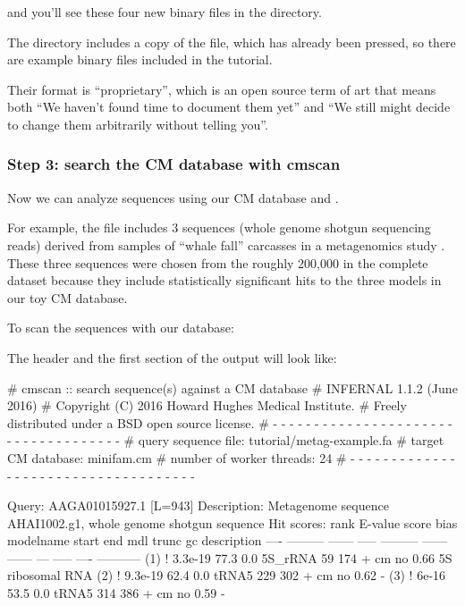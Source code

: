 and you'll see these four new binary files in the directory. 

The  directory includes a copy of the
 file, which has already been pressed, so there
are example binary files 
included in the tutorial.

Their format is ``proprietary'', which is an open source term of art
that means both ``We haven't found time to document them yet'' and ``We
still might decide to change them arbitrarily without telling you''.

\subsubsection{Step 3: search the CM database with cmscan}

Now we can analyze sequences using our CM database and
. 

For example, the file  includes 3
sequences (whole genome shotgun sequencing reads) derived from samples
of ``whale fall'' carcasses in a metagenomics study
\citep{Tringe05}. These three sequences were chosen from the roughly
200,000 in the complete dataset because they include statistically
significant hits to the three models in our toy CM database.

To scan the sequences with our database: 


The header and the first section of the output will look like:

\newpage

\begin{sreoutput}
# cmscan :: search sequence(s) against a CM database
# INFERNAL 1.1.2 (June 2016)
# Copyright (C) 2016 Howard Hughes Medical Institute.
# Freely distributed under a BSD open source license.
# - - - - - - - - - - - - - - - - - - - - - - - - - - - - - - - - - - - -
# query sequence file:                   tutorial/metag-example.fa
# target CM database:                    minifam.cm
# number of worker threads:              24
# - - - - - - - - - - - - - - - - - - - - - - - - - - - - - - - - - - - -

Query:       AAGA01015927.1  [L=943]
Description: Metagenome sequence AHAI1002.g1, whole genome shotgun sequence
Hit scores:
 rank     E-value  score  bias  modelname  start    end   mdl trunc   gc  description
 ----   --------- ------ -----  --------- ------ ------   --- ----- ----  -----------
  (1) !   3.3e-19   77.3   0.0  5S_rRNA       59    174 +  cm    no 0.66  5S ribosomal RNA
  (2) !   9.3e-19   62.4   0.0  tRNA5        229    302 +  cm    no 0.62  -
  (3) !     6e-16   53.5   0.0  tRNA5        314    386 +  cm    no 0.59  -
\end{sreoutput}

